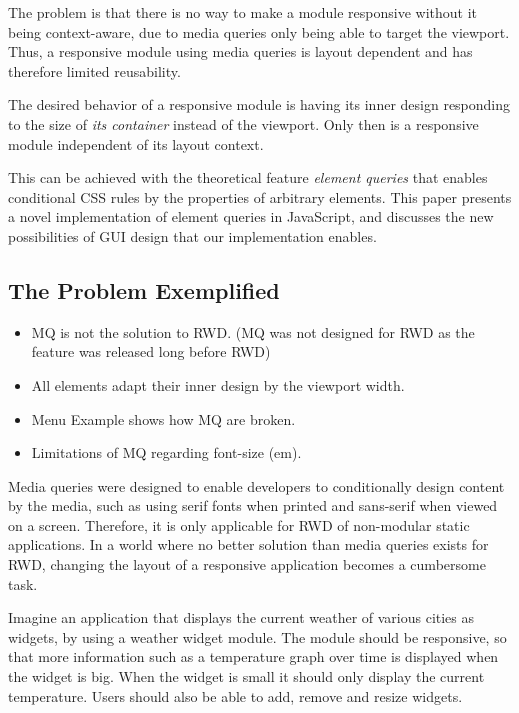 \documentclass{acm_proc_article-sp}
\begin{document}
  The problem is that there is no way to make a module responsive without it being context-aware, due to media queries only being able to target the viewport.
  Thus, a responsive module using media queries is layout dependent and has therefore limited reusability.

  The desired behavior of a responsive module is having its inner design responding to the size of \emph{its container} instead of the viewport.
  Only then is a responsive module independent of its layout context.

  This can be achieved with the theoretical feature \emph{element queries} that enables conditional CSS rules by the properties of arbitrary elements.
  This paper presents a novel implementation of element queries in JavaScript, and discusses the new possibilities of GUI design that our implementation enables.

  \subsection{The Problem Exemplified}
    \begin{itemize}
      \item MQ is not the solution to RWD. (MQ was not designed for RWD as the feature was released long before RWD)
      \item All elements adapt their inner design by the viewport width.
      \item Menu Example shows how MQ are broken.
      \item Limitations of MQ regarding font-size (em).
    \end{itemize}

    Media queries were designed to enable developers to conditionally design content by the media, such as using serif fonts when printed and sans-serif when viewed on a screen.
    Therefore, it is only applicable for RWD of non-modular static applications.
    In a world where no better solution than media queries exists for RWD, changing the layout of a responsive application becomes a cumbersome task.
    
    Imagine an application that displays the current weather of various cities as widgets, by using a weather widget module.
    The module should be responsive, so that more information such as a temperature graph over time is displayed when the widget is big.
    When the widget is small it should only display the current temperature.
    Users should also be able to add, remove and resize widgets.
\end{document}
